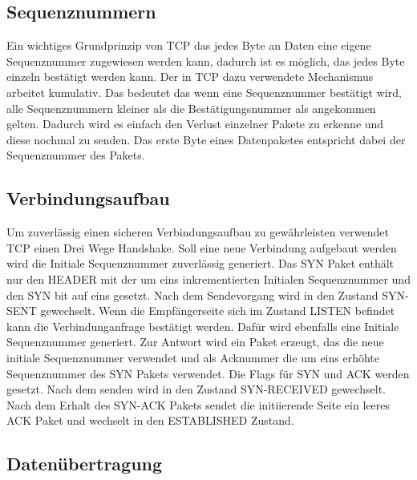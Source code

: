 \subsection{Sequenznummern}
Ein wichtiges Grundprinzip von TCP das jedes Byte an Daten eine eigene Sequenznummer zugewiesen werden kann, dadurch ist es möglich, das jedes Byte einzeln bestätigt werden kann. Der in TCP dazu verwendete Mechanismus arbeitet kumulativ. Das bedeutet das wenn eine Sequenznummer bestätigt wird, alle Sequenznummern kleiner als die Bestätigungsnummer als angekommen gelten. Dadurch wird es einfach den Verlust einzelner Pakete zu erkenne und diese nochmal zu senden. Das erste Byte eines Datenpaketes entspricht dabei der Sequenznummer des Pakets. 

\subsection{Verbindungsaufbau}
Um zuverlässig einen sicheren Verbindungsaufbau zu gewährleisten verwendet TCP einen Drei Wege Handshake. Soll eine neue Verbindung aufgebaut werden wird die Initiale Sequenznummer zuverlässig generiert. Das SYN Paket enthält nur den HEADER mit der um eins inkrementierten Initialen Sequenznummer und den SYN bit auf eins gesetzt. Nach dem Sendevorgang wird in den Zustand SYN-SENT gewechselt. Wenn die Empfängerseite sich im Zustand LISTEN befindet kann die Verbindunganfrage bestätigt werden. Dafür wird ebenfalls eine Initiale Sequenznummer generiert. Zur Antwort wird ein Paket erzeugt, das die neue initiale Sequenznummer verwendet und als Acknummer die um eins erhöhte Sequenznummer des SYN Pakets verwendet. Die Flags für SYN und ACK werden gesetzt. Nach dem senden wird in den Zustand SYN-RECEIVED gewechselt.\\
Nach dem Erhalt des SYN-ACK Pakets sendet die initiierende Seite ein leeres ACK Paket und wechselt in den ESTABLISHED Zustand. 

\subsection{Datenübertragung}

